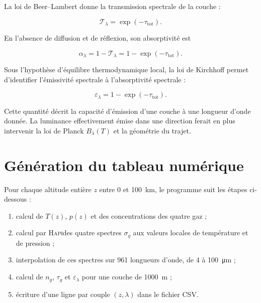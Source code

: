 \documentclass[11pt,a4paper]{article}
\newcommand{\HAPI}{\textsc{Hapi}}
\begin{document}
La loi de Beer--Lambert donne la transmission spectrale de la couche :

\begin{equation}
  \mathcal{T}_\lambda=\exp(-\tau_{\mathrm{tot}}).
  \label{eq:transmission}
\end{equation}

En l'absence de diffusion et de réflexion, son absorptivité est

\begin{equation}
  \alpha_\lambda=1-\mathcal{T}_\lambda
  =1-\exp(-\tau_{\mathrm{tot}}).
  \label{eq:absorptivite}
\end{equation}

Sous l'hypothèse d'équilibre thermodynamique local, la loi de Kirchhoff permet
d'identifier l'émissivité spectrale à l'absorptivité spectrale :

\begin{equation}
  \boxed{\varepsilon_\lambda
  =1-\exp(-\tau_{\mathrm{tot}})}.
  \label{eq:emissivite}
\end{equation}

Cette quantité décrit la capacité d'émission d'une couche à une longueur
d'onde donnée. La luminance effectivement émise dans une direction ferait en
plus intervenir la loi de Planck $B_\lambda(T)$ et la géométrie du trajet.

\section{Génération du tableau numérique}

Pour chaque altitude entière $z$ entre 0 et \SI{100}{\kilo\metre}, le
programme suit les étapes ci-dessous :

\begin{enumerate}
  \item calcul de $T(z)$, $p(z)$ et des concentrations des quatre gaz ;
  \item calcul par \HAPI des quatre spectres $\sigma_g$ aux valeurs locales de
        température et de pression ;
  \item interpolation de ces spectres sur 961 longueurs d'onde, de 4 à
        \SI{100}{\micro\metre} ;
  \item calcul de $n_g$, $\tau_g$ et $\varepsilon_\lambda$ pour une couche de
        \SI{1000}{\metre} ;
  \item écriture d'une ligne par couple $(z,\lambda)$ dans le fichier CSV.
\end{enumerate}
\end{document}
